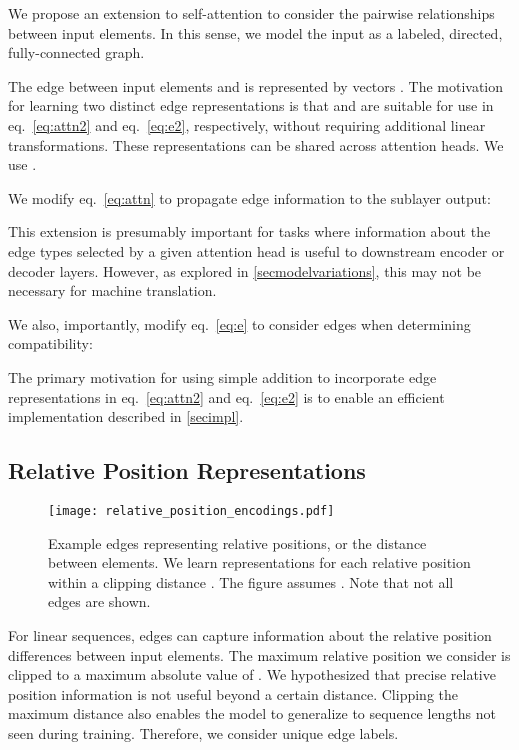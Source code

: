 \documentclass[11pt,a4paper]{article}
\begin{document}
We propose an extension to self-attention to consider the
pairwise relationships between input elements. In this sense, we model the input as a labeled, directed, fully-connected graph.

The edge between input elements  and  is represented by vectors . The motivation for learning two distinct edge representations is that  and  are suitable for use in eq.~\eqref{eq:attn2} and eq.~\eqref{eq:e2}, respectively, without requiring additional linear transformations.
These representations can be shared across attention heads. We use .

We modify eq.~\eqref{eq:attn} to propagate edge information to the sublayer output:



This extension is presumably important for tasks where information about the edge types selected by a given attention head is useful to downstream encoder or decoder layers. However, as explored in \ref{secmodelvariations}, this may not be necessary for machine translation.

We also, importantly, modify eq.~\eqref{eq:e} to consider edges when determining compatibility:



The primary motivation for using simple addition to incorporate edge representations in eq.~\eqref{eq:attn2} and eq.~\eqref{eq:e2} is to enable an efficient implementation described in \ref{secimpl}. 

\subsection{Relative Position Representations}

\begin{figure}[t!]
\begin{center}
\texttt{[image: relative\_position\_encodings.pdf]}
\caption{Example edges representing relative positions, or the distance between elements. We learn representations for each relative position within a clipping distance . The figure assumes . Note that not all edges are shown.}
\label{fig:relative_position_encodings}
\end{center}
\end{figure}

For linear sequences, edges can capture information about the relative position differences between input elements.
The maximum relative position we consider is clipped to a maximum absolute value of .
We hypothesized that precise relative position information is not useful beyond a certain distance.
Clipping the maximum distance also enables the model to generalize to sequence lengths not seen during training.
Therefore, we consider  unique edge labels.
\end{document}
